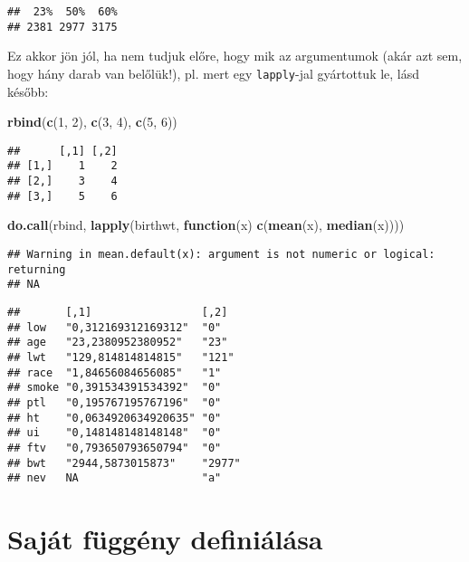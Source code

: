 \documentclass[]{book}
\newenvironment{Shaded}{\begin{snugshade}}{\end{snugshade}}
\newcommand{\ControlFlowTok}[1]{\textcolor[rgb]{0.13,0.29,0.53}{\textbf{#1}}}
\newcommand{\DecValTok}[1]{\textcolor[rgb]{0.00,0.00,0.81}{#1}}
\newcommand{\KeywordTok}[1]{\textcolor[rgb]{0.13,0.29,0.53}{\textbf{#1}}}
\newcommand{\NormalTok}[1]{#1}
\begin{document}
\begin{verbatim}
##  23%  50%  60% 
## 2381 2977 3175
\end{verbatim}

Ez akkor jön jól, ha nem tudjuk előre, hogy mik az argumentumok (akár azt sem, hogy hány darab van belőlük!), pl. mert egy \texttt{lapply}-jal gyártottuk le, lásd később:

\begin{Shaded}
\begin{Highlighting}[]
\KeywordTok{rbind}\NormalTok{(}\KeywordTok{c}\NormalTok{(}\DecValTok{1}\NormalTok{, }\DecValTok{2}\NormalTok{), }\KeywordTok{c}\NormalTok{(}\DecValTok{3}\NormalTok{, }\DecValTok{4}\NormalTok{), }\KeywordTok{c}\NormalTok{(}\DecValTok{5}\NormalTok{, }\DecValTok{6}\NormalTok{))}
\end{Highlighting}
\end{Shaded}

\begin{verbatim}
##      [,1] [,2]
## [1,]    1    2
## [2,]    3    4
## [3,]    5    6
\end{verbatim}

\begin{Shaded}
\begin{Highlighting}[]
\KeywordTok{do.call}\NormalTok{(rbind, }\KeywordTok{lapply}\NormalTok{(birthwt, }\ControlFlowTok{function}\NormalTok{(x) }\KeywordTok{c}\NormalTok{(}\KeywordTok{mean}\NormalTok{(x), }\KeywordTok{median}\NormalTok{(x))))}
\end{Highlighting}
\end{Shaded}

\begin{verbatim}
## Warning in mean.default(x): argument is not numeric or logical: returning
## NA
\end{verbatim}

\begin{verbatim}
##       [,1]                 [,2]  
## low   "0,312169312169312"  "0"   
## age   "23,2380952380952"   "23"  
## lwt   "129,814814814815"   "121" 
## race  "1,84656084656085"   "1"   
## smoke "0,391534391534392"  "0"   
## ptl   "0,195767195767196"  "0"   
## ht    "0,0634920634920635" "0"   
## ui    "0,148148148148148"  "0"   
## ftv   "0,793650793650794"  "0"   
## bwt   "2944,5873015873"    "2977"
## nev   NA                   "a"
\end{verbatim}

\hypertarget{sajuxe1t-fuxfcgguxe9ny-definiuxe1luxe1sa}{%
\section{Saját függény definiálása}\label{sajuxe1t-fuxfcgguxe9ny-definiuxe1luxe1sa}}
\end{document}
